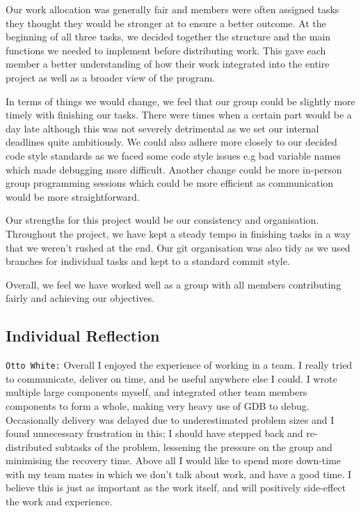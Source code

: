 \documentclass[11pt]{article}
\begin{document}
Our work allocation was generally fair and members were often assigned tasks they thought they would be stronger at to ensure a better outcome. At the beginning of all three tasks, we decided together the structure and the main functions we needed to implement before distributing work. This gave each member a better understanding of how their work integrated into the entire project as well as a broader view of the program.

In terms of things we would change, we feel that our group could be slightly more timely with finishing our tasks. There were times when a certain part would be a day late although this was not severely detrimental as we set our internal deadlines quite ambitiously. We could also adhere more closely to our decided code style standards as we faced some code style issues e.g bad variable names which made debugging more difficult. Another change could be more in-person group programming sessions which could be more efficient as communication would be more straightforward.

Our strengths for this project would be our consistency and organisation. Throughout the project, we have kept a steady tempo in finishing tasks in a way that we weren't rushed at the end. Our git organisation was also tidy as we used branches for individual tasks and kept to a standard commit style.

Overall, we feel we have worked well as a group with all members contributing fairly and achieving our objectives.

  \subsection*{Individual Reflection}

\texttt{Otto White:} Overall I enjoyed the experience of working in a team. I really tried to communicate, deliver on time, and be useful anywhere else I could. I wrote multiple large components myself, and integrated other team members components to form a whole, making very heavy use of GDB to debug. Occasionally delivery was delayed due to underestimated problem sizes and I found unnecessary frustration in this; I should have stepped back and re-distributed subtasks of the problem, lessening the pressure on the group and minimising the recovery time. Above all I would like to spend more down-time with my team mates in which we don’t talk about work, and have a good time. I believe this is just as important as the work itself, and will positively side-effect the work and experience.
\end{document}
